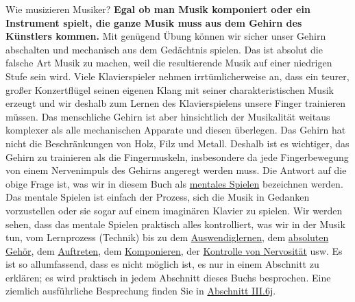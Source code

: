 Wie musizieren Musiker?
\textbf{Egal ob man Musik komponiert oder ein Instrument spielt, die ganze Musik muss aus dem Gehirn des Künstlers kommen.}
Mit genügend Übung können wir sicher unser Gehirn abschalten und mechanisch aus dem Gedächtnis spielen.
Das ist absolut die falsche Art Musik zu machen, weil die resultierende Musik auf einer niedrigen Stufe sein wird.
Viele Klavierspieler nehmen irrtümlicherweise an, dass ein teurer, großer Konzertflügel seinen eigenen Klang mit seiner charakteristischen Musik erzeugt und wir deshalb zum Lernen des Klavierspielens unsere Finger trainieren müssen.
Das menschliche Gehirn ist aber hinsichtlich der Musikalität weitaus komplexer als alle mechanischen Apparate und diesen überlegen.
Das Gehirn hat nicht die Beschränkungen von Holz, Filz und Metall.
Deshalb ist es wichtiger, das Gehirn zu trainieren als die Fingermuskeln, insbesondere da jede Fingerbewegung von einem Nervenimpuls des Gehirns angeregt werden muss.
Die Antwort auf die obige Frage ist, was wir in diesem Buch als \hyperref[c1ii12mental]{mentales Spielen} bezeichnen werden.
Das mentale Spielen ist einfach der Prozess, sich die Musik in Gedanken vorzustellen oder sie sogar auf einem imaginären Klavier zu spielen.
Wir werden sehen, dass das mentale Spielen praktisch alles kontrolliert, was wir in der Musik tun, vom Lernprozess (Technik) bis zu dem \hyperref[c1iii6]{Auswendiglernen}, dem \hyperref[c1iii12]{absoluten Gehör}, dem \hyperref[c1iii14]{Auftreten}, dem \hyperref[c1iii12blatt]{Komponieren}, der \hyperref[c1iii15]{Kontrolle von Nervosität} usw.
Es ist so allumfassend, dass es nicht möglich ist, es nur in einem Abschnitt zu erklären; es wird praktisch in jedem Abschnitt dieses Buchs besprochen.
Eine ziemlich ausführliche Besprechung finden Sie in \hyperref[c1iii6tastatur]{Abschnitt III.6j}.

